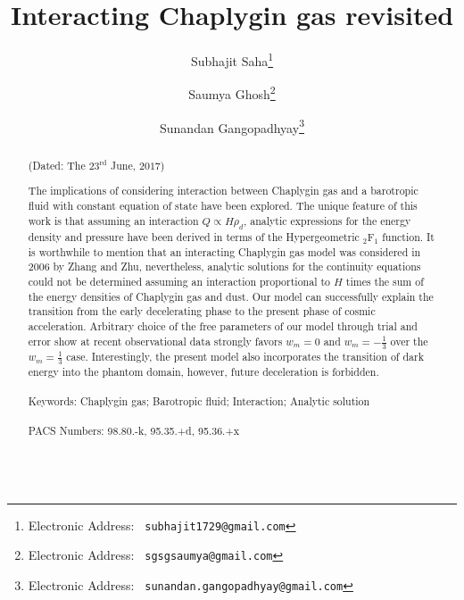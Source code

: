 \documentclass[two-column, nofootinbib]{revtex4-1}
\begin{document}
\title{Interacting Chaplygin gas revisited}


\author{Subhajit Saha\footnote {Electronic Address: \texttt{\color{blue} subhajit1729@gmail.com}}}
\author{Saumya Ghosh\footnote {Electronic Address: \texttt{\color{blue} sgsgsaumya@gmail.com}}}
\author{Sunandan Gangopadhyay\footnote {Electronic Address: \texttt{\color{blue} sunandan.gangopadhyay@gmail.com}}}


\begin{abstract}

\begin{center}
(Dated: The $23^{\text{rd}}$ June, $2017$)
\end{center}

The implications of considering interaction between Chaplygin gas and a barotropic fluid with constant equation of state have been explored. The unique feature of this work is that assuming an interaction $Q \propto H\rho_d$, analytic expressions for the energy density and pressure have been derived in terms of the Hypergeometric $_2\text{F}_1$ function. It is worthwhile to mention that an interacting Chaplygin gas model was considered in 2006 by Zhang and Zhu, nevertheless, analytic solutions for the continuity equations could not be determined assuming an interaction proportional to $H$ times the sum of the energy densities of Chaplygin gas and dust. Our model can successfully explain the transition from the early decelerating phase to the present phase of cosmic acceleration. Arbitrary choice of the free parameters of our model through trial and error show at recent observational data strongly favors $w_m=0$ and $w_m=-\frac{1}{3}$ over the $w_m=\frac{1}{3}$ case. Interestingly, the present model also incorporates the transition of dark energy into the phantom domain, however, future deceleration is forbidden. \\\\ 
Keywords: Chaplygin gas; Barotropic fluid; Interaction; Analytic solution\\\\
PACS Numbers: 98.80.-k, 95.35.+d, 95.36.+x \\\\

\end{abstract}
\end{document}
